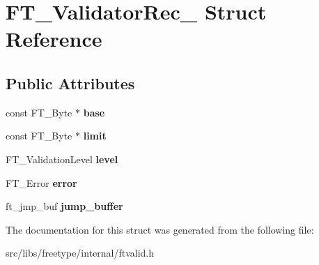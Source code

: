 \hypertarget{struct_f_t___validator_rec__}{
\section{FT\_\-ValidatorRec\_\- Struct Reference}
\label{struct_f_t___validator_rec__}
}
\subsection*{Public Attributes}
\begin{DoxyCompactItemize}
\item 
\hypertarget{struct_f_t___validator_rec___a62de459b75acae3e1695b3d6600ca22f}{
const FT\_\-Byte $\ast$ {\bfseries base}}
\label{struct_f_t___validator_rec___a62de459b75acae3e1695b3d6600ca22f}

\item 
\hypertarget{struct_f_t___validator_rec___acc4d58a3e46d2b7c92bb51c3ddd8d331}{
const FT\_\-Byte $\ast$ {\bfseries limit}}
\label{struct_f_t___validator_rec___acc4d58a3e46d2b7c92bb51c3ddd8d331}

\item 
\hypertarget{struct_f_t___validator_rec___aa70830280c76507b8b06e616da8cb545}{
FT\_\-ValidationLevel {\bfseries level}}
\label{struct_f_t___validator_rec___aa70830280c76507b8b06e616da8cb545}

\item 
\hypertarget{struct_f_t___validator_rec___ab12d54f54a55a90ce19761a1c24e28f0}{
FT\_\-Error {\bfseries error}}
\label{struct_f_t___validator_rec___ab12d54f54a55a90ce19761a1c24e28f0}

\item 
\hypertarget{struct_f_t___validator_rec___aa0b346f9ef78939e93c85389aa2b54b3}{
ft\_\-jmp\_\-buf {\bfseries jump\_\-buffer}}
\label{struct_f_t___validator_rec___aa0b346f9ef78939e93c85389aa2b54b3}

\end{DoxyCompactItemize}


The documentation for this struct was generated from the following file:\begin{DoxyCompactItemize}
\item 
src/libs/freetype/internal/ftvalid.h\end{DoxyCompactItemize}
